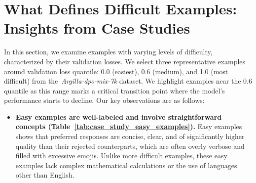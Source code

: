 \section{What Defines Difficult Examples: Insights from Case Studies}
\label{app:case_study_difficult_example}
In this section, we examine examples with varying levels of difficulty, characterized by their validation losses. We select three representative examples around validation loss quantile: 0.0 (easiest), 0.6 (medium), and 1.0 (most difficult) from the~\textit{Argilla-dpo-mix-7k} dataset. 
We highlight examples near the 0.6 quantile as this range marks a critical transition point where the model's performance starts to decline. Our key observations are as follows:
\begin{itemize}
    \item \textbf{Easy examples are well-labeled and involve straightforward concepts (Table~\ref{tab:case_study_easy_examples}).} Easy examples shows that preferred responses are concise, clear, and of significantly higher quality than their rejected counterparts, which are often overly verbose and filled with excessive emojis. Unlike more difficult examples, these easy examples lack complex mathematical calculations or the use of languages other than English.
\end{itemize}
